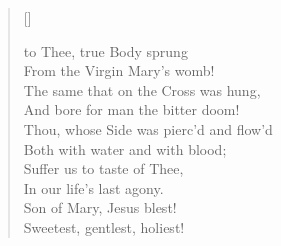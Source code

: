 \newHymn
\JustHymnNum

\pointtrans
{}






\newHymn


\begin{verse}[\versewidth]

 to Thee, true Body sprung\\
From the Virgin Mary's womb!\\
The same that on the Cross was hung,\\
And bore for man the bitter doom!\pointorig\\
Thou, whose Side was pierc'd and flow'd\\
Both with water and with blood;\\
Suffer us to taste of Thee,\\
In our life's last agony.\\
Son of Mary, Jesus blest!\\
Sweetest, gentlest, holiest!

\end{verse}


